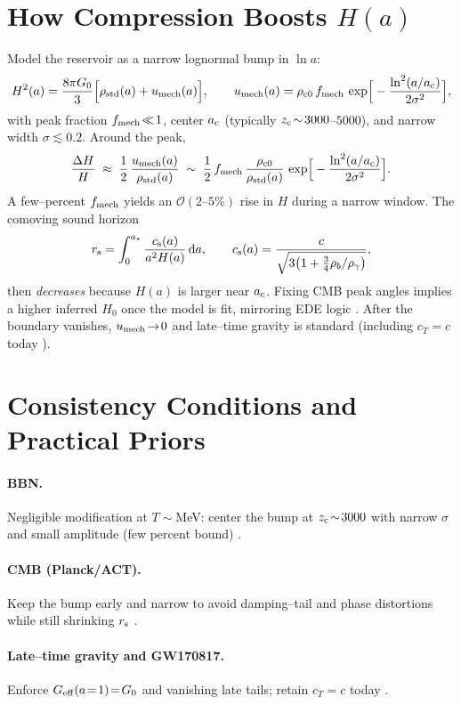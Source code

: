 \documentclass[11pt,a4paper]{article}
\newcommand{\rs}{r_{\rm s}}
\newcommand{\Geff}{G_{\rm eff}}
\newcommand{\ac}{a_{\rm c}}
\newcommand{\zc}{z_{\rm c}}
\newcommand{\cs}{c_{\rm s}}
\newcommand{\be}{\begin{equation}}
\newcommand{\ee}{\end{equation}}
\newcommand{\dx}{\mathrm{d}}
\begin{document}
\section{How Compression Boosts \texorpdfstring{$H(a)$}{H(a)}}
Model the reservoir as a narrow lognormal bump in $\ln a$:
\be
H^2(a)=\frac{8\pi G_0}{3}\Big[\rho_{\rm std}(a)+u_{\rm mech}(a)\Big],
\qquad
u_{\rm mech}(a)=\rho_{\rm c0}\,f_{\rm mech}\,
\exp\!\Big[-\frac{\ln^2(a/\ac)}{2\sigma^2}\Big],
\label{eq:Hboost}
\ee
with peak fraction $f_{\rm mech}\!\ll\!1$, center $\ac$ (typically $\zc\!\sim\!3000$--$5000$), and narrow width $\sigma\!\lesssim\!0.2$. Around the peak,
\be
\frac{\Delta H}{H}\;\approx\;\frac{1}{2}\,\frac{u_{\rm mech}(a)}{\rho_{\rm std}(a)}
\;\sim\;\frac{1}{2}\,f_{\rm mech}\,\frac{\rho_{\rm c0}}{\rho_{\rm std}(a)}\,
\exp\!\Big[-\frac{\ln^2(a/\ac)}{2\sigma^2}\Big].
\ee
A few--percent $f_{\rm mech}$ yields an $\mathcal{O}(2\text{--}5\%)$ rise in $H$ during a narrow window. The comoving sound horizon
\be
\rs=\int_0^{a_\ast}\frac{\cs(a)}{a^2 H(a)}\,\dx a,
\qquad
\cs(a)=\frac{c}{\sqrt{3\big(1+\tfrac{3}{4}\rho_b/\rho_\gamma\big)}},
\ee
then \emph{decreases} because $H(a)$ is larger near $\ac$. Fixing CMB peak angles implies a higher inferred $H_0$ once the model is fit, mirroring EDE logic \cite{EDEReview2023,PoulinReview2023,Planck2018}. After the boundary vanishes, $u_{\rm mech}\!\to\!0$ and late--time gravity is standard (including $c_T\!=\!c$ today \cite{GW170817}).

\section{Consistency Conditions and Practical Priors}
\paragraph{BBN.} Negligible modification at $T\!\sim$MeV: center the bump at $\zc\!\sim\!3000$ with narrow $\sigma$ and small amplitude (few percent bound) \cite{Alvey2020}.

\paragraph{CMB (Planck/ACT).} Keep the bump early and narrow to avoid damping--tail and phase distortions while still shrinking $\rs$ \cite{Planck2018,EDEReview2023,PoulinReview2023}.

\paragraph{Late--time gravity and GW170817.} Enforce $\Geff(a\!=\!1)\!=\!G_0$ and vanishing late tails; retain $c_T\!=\!c$ today \cite{GW170817}.
\end{document}
